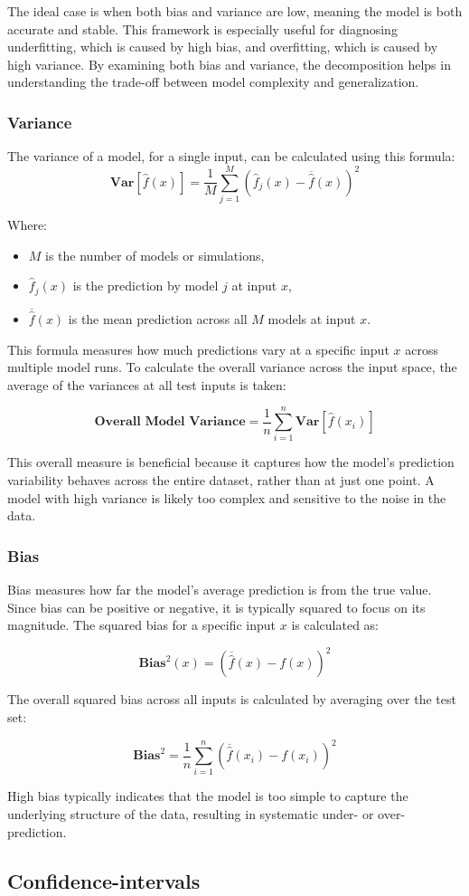 The ideal case is when both bias and variance are low, meaning the model is both accurate and stable. This framework is especially useful for diagnosing underfitting, which is caused by high bias, and overfitting, which is caused by high variance. By examining both bias and variance, the decomposition helps in understanding the trade-off between model complexity and generalization.

\subsubsection{Variance}
The variance of a model, for a single input, can be calculated using this formula:
$$
\textbf{Var}[\hat{f}(x)] = \frac{1}{M} \sum_{j=1}^{M} (\hat{f}_j(x) - \overline{\hat{f}}(x))^2
$$

Where:
\begin{itemize}
	\item $M$ is the number of models or simulations,
	\item $\hat{f}_j(x)$ is the prediction by model $j$ at input $x$,
	\item $\overline{\hat{f}}(x)$ is the mean prediction across all $M$ models at input $x$.
\end{itemize}

This formula measures how much predictions vary at a specific input $x$ across multiple model runs. To calculate the overall variance across the input space, the average of the variances at all test inputs is taken:

$$
\textbf{Overall Model Variance} = \frac{1}{n} \sum_{i=1}^{n} \textbf{Var}[\hat{f}(x_i)]
$$

This overall measure is beneficial because it captures how the model’s prediction variability behaves across the entire dataset, rather than at just one point. A model with high variance is likely too complex and sensitive to the noise in the data.

\subsubsection{Bias}
Bias measures how far the model’s average prediction is from the true value. Since bias can be positive or negative, it is typically squared to focus on its magnitude. The squared bias for a specific input $x$ is calculated as:

$$
\textbf{Bias}^2(x) = (\overline{\hat{f}}(x) - f(x))^2
$$

The overall squared bias across all inputs is calculated by averaging over the test set:

$$
\textbf{Bias}^2 = \frac{1}{n} \sum_{i=1}^{n} (\overline{\hat{f}}(x_i) - f(x_i))^2
$$

High bias typically indicates that the model is too simple to capture the underlying structure of the data, resulting in systematic under- or over-prediction.



\subsection{Confidence-intervals}